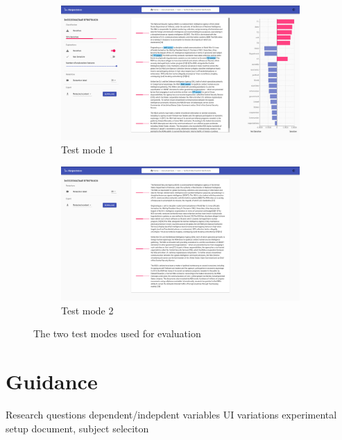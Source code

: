 \documentclass{l4proj}
\begin{document}
\begin{figure}[h]
    \centering
    \begin{subfigure}[b]{0.7\textwidth}
        \centering
        \includegraphics[width=\linewidth]{images/ui_test_mode_1.png}
        \caption{Test mode 1}
        \label{fig:test_mode_1}
    \end{subfigure}
    
    
    \begin{subfigure}[b]{0.7\textwidth}
        \centering
        \includegraphics[width=\linewidth]{images/ui_test_mode_2.png}
        \caption{Test mode 2}
        \label{fig:test_mode_2}
    \end{subfigure}
    \caption{The two test modes used for evaluation}
    \label{fig:test_modes}
\end{figure}



\section{Guidance}

Research questions
dependent/indepdent variables
UI variations
experimental setup
document, subject seleciton
\end{document}
